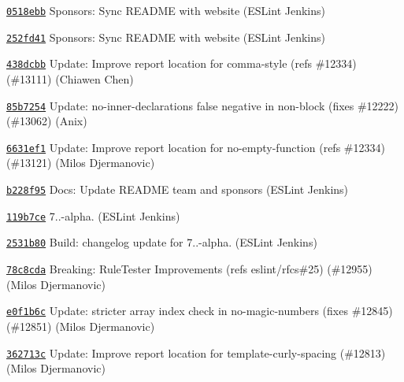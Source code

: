 \begin{DoxyItemize}
\item \href{https://github.com/eslint/eslint/commit/0518ebb840b5bf2d646dbd8a9b3e246e7069eb79}{\texttt{ {\ttfamily 0518ebb}}} Sponsors\+: Sync README with website (ESLint Jenkins)
\item \href{https://github.com/eslint/eslint/commit/252fd4133805f003151e0220b5d89bbb70cfacb1}{\texttt{ {\ttfamily 252fd41}}} Sponsors\+: Sync README with website (ESLint Jenkins)
\item \href{https://github.com/eslint/eslint/commit/438dcbb981214d67e8848006ce45afc0fbfa1705}{\texttt{ {\ttfamily 438dcbb}}} Update\+: Improve report location for comma-\/style (refs \#12334) (\#13111) (Chiawen Chen)
\item \href{https://github.com/eslint/eslint/commit/85b72548c0c893499c787b82f404348e1b50354d}{\texttt{ {\ttfamily 85b7254}}} Update\+: no-\/inner-\/declarations false negative in non-\/block (fixes \#12222) (\#13062) (Anix)
\item \href{https://github.com/eslint/eslint/commit/6631ef1678bbdd48680fb3025c3692abd0aeec4a}{\texttt{ {\ttfamily 6631ef1}}} Update\+: Improve report location for no-\/empty-\/function (refs \#12334) (\#13121) (Milos Djermanovic)
\item \href{https://github.com/eslint/eslint/commit/b228f958afaf507d6f6f99c90b2075b395733839}{\texttt{ {\ttfamily b228f95}}} Docs\+: Update README team and sponsors (ESLint Jenkins)
\item \href{https://github.com/eslint/eslint/commit/119b7ce97993b84df5af4e4f82e5102e430dfff1}{\texttt{ {\ttfamily 119b7ce}}} 7..-\/alpha. (ESLint Jenkins)
\item \href{https://github.com/eslint/eslint/commit/2531b802a1527ea1084905641a17befcb50350c7}{\texttt{ {\ttfamily 2531b80}}} Build\+: changelog update for 7..-\/alpha. (ESLint Jenkins)
\item \href{https://github.com/eslint/eslint/commit/78c8cda5a5d82f5f8548c4528a6438d29756bb71}{\texttt{ {\ttfamily 78c8cda}}} Breaking\+: Rule\+Tester Improvements (refs eslint/rfcs\#25) (\#12955) (Milos Djermanovic)
\item \href{https://github.com/eslint/eslint/commit/e0f1b6c3d62f725b99b8c07654603b559ba43ba9}{\texttt{ {\ttfamily e0f1b6c}}} Update\+: stricter array index check in no-\/magic-\/numbers (fixes \#12845) (\#12851) (Milos Djermanovic)
\item \href{https://github.com/eslint/eslint/commit/362713c04aa89092b2b98a77fa94a75b3c933fc6}{\texttt{ {\ttfamily 362713c}}} Update\+: Improve report location for template-\/curly-\/spacing (\#12813) (Milos Djermanovic)

\end{DoxyItemize}
